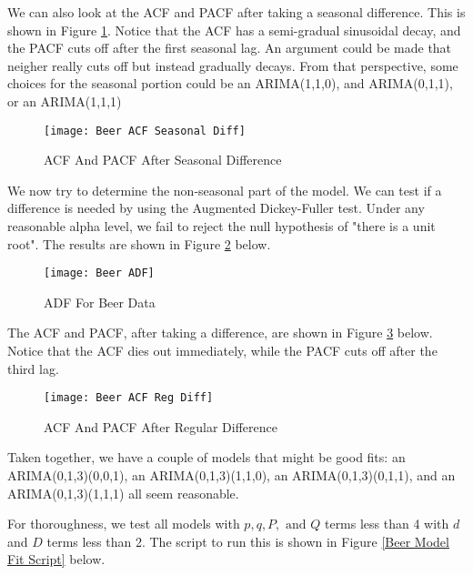 \documentclass[12pt, letterpaper]{article}
\theoremstyle{definition}
\numberwithin{equation}{section}
\newcommand{\+}[1]{+_{\scalebox{.375}{#1}}}
\newcommand{\1}{\mathbbm{1}}
\begin{document}
We can also look at the ACF and PACF after taking a seasonal difference. This is shown in Figure \ref{Beer ACF Seasonal Diff}. Notice that the ACF has a semi-gradual sinusoidal decay, and the PACF cuts off after the first seasonal lag. An argument could be made that neigher really cuts off but instead gradually decays. From that perspective, some choices for the seasonal portion could be an ARIMA(1,1,0), and ARIMA(0,1,1), or an ARIMA(1,1,1)

\begin{figure}[H]
	\centering
	\texttt{[image: Beer ACF Seasonal Diff]}
	\caption{ACF And PACF After Seasonal Difference}
	\label{Beer ACF Seasonal Diff}
\end{figure}

\newpage
We now try to determine the non-seasonal part of the model. We can test if a difference is needed by using the Augmented Dickey-Fuller test. Under any reasonable alpha level, we fail to reject the null hypothesis of "there is a unit root". The results are shown in Figure \ref{Beer ADF} below.

\begin{figure}[H]
	\centering
	\texttt{[image: Beer ADF]}
	\caption{ADF For Beer Data}
	\label{Beer ADF}
\end{figure}

The ACF and PACF, after taking a difference, are shown in Figure \ref{Beer ACF Reg Diff} below. Notice that the ACF dies out immediately, while the PACF cuts off after the third lag.

\begin{figure}[H]
	\centering
	\texttt{[image: Beer ACF Reg Diff]}
	\caption{ACF And PACF After Regular Difference}
	\label{Beer ACF Reg Diff}
\end{figure}

Taken together, we have a couple of models that might be good fits: an ARIMA(0,1,3)(0,0,1), an ARIMA(0,1,3)(1,1,0), an ARIMA(0,1,3)(0,1,1), and an ARIMA(0,1,3)(1,1,1) all seem reasonable.



\newpage
\noindent\textbf{}
\vspace{\baselineskip}

For thoroughness, we test all models with $p,q, P, \text{ and } Q$ terms less than 4 with $d$ and $D$ terms less than 2. The script to run this is shown in Figure \ref{Beer Model Fit Script} below.
\end{document}
